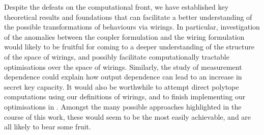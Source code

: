 \documentclass[10pt, a4paper]{article}
\numberwithin{equation}{section} %
\theoremstyle{definition}
\theoremstyle{plain}
\newcommand{\?}{\mathrel{?}} %
\begin{document}
                  Despite the defeats on the computational front, we have established key theoretical results and foundations that can facilitate a better understanding of the possible transformations of behaviours via wirings. In particular, investigation of the anomalies between the coupler formulation and the wiring formulation would likely to be fruitful for coming to a deeper understanding of the structure of the space of wirings, and possibly facilitate computationally tractable optimisations over the space of wirings. Similarly, the study of measurement dependence could explain how output dependence can lead to an increase in secret key capacity. It would also be worthwhile to attempt direct polytope computations using our definitions of wirings, and to finish implementing our optimisations in . Amongst the many possible approaches highlighted in the course of this work, these would seem to be the most easily achievable, and are all likely to bear some fruit.

                  \clearpage

                  \printbibliography{}
                  \clearpage
\end{document}

